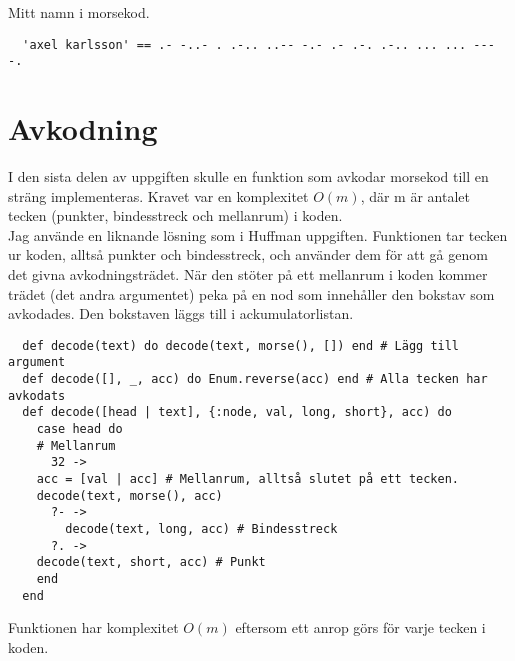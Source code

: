 \documentclass[a4paper,11pt]{article}
\begin{document}
Mitt namn i morsekod.

\begin{verbatim}
  'axel karlsson' == .- -..- . .-.. ..-- -.- .- .-. .-.. ... ... --- -.
\end{verbatim}

\section*{Avkodning}
I den sista delen av uppgiften skulle en funktion som avkodar morsekod till en sträng implementeras. Kravet var en komplexitet \(O(m)\), där m är antalet tecken (punkter, bindesstreck och mellanrum) i koden.\\
Jag använde en liknande lösning som i Huffman uppgiften. Funktionen tar tecken ur koden, alltså punkter och bindesstreck, och använder dem för att gå genom det givna avkodningsträdet. När den stöter på ett mellanrum i koden kommer trädet (det andra argumentet) peka på en nod som innehåller den bokstav som avkodades. Den bokstaven läggs till i ackumulatorlistan.

\begin{verbatim}
  def decode(text) do decode(text, morse(), []) end # Lägg till argument
  def decode([], _, acc) do Enum.reverse(acc) end # Alla tecken har avkodats
  def decode([head | text], {:node, val, long, short}, acc) do
    case head do
    # Mellanrum
      32 ->
	acc = [val | acc] # Mellanrum, alltså slutet på ett tecken.
	decode(text, morse(), acc)
      ?- ->
        decode(text, long, acc) # Bindesstreck
      ?. ->
	decode(text, short, acc) # Punkt
    end
  end
\end{verbatim}

Funktionen har komplexitet \(O(m)\) eftersom ett anrop görs för varje tecken i koden.
\end{document}
